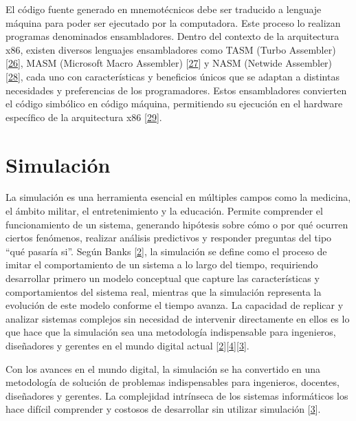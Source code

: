 \documentclass[12pt,twoside]{templates/unerthesis}
\begin{document}
El código fuente generado en mnemotécnicos debe ser traducido a lenguaje máquina para poder ser ejecutado por la computadora. Este proceso lo realizan programas denominados ensambladores. Dentro del contexto de la arquitectura x86, existen diversos lenguajes ensambladores como TASM (Turbo Assembler) {[}\protect\hyperlink{ref-tasm}{26}{]}, MASM (Microsoft Macro Assembler) {[}\protect\hyperlink{ref-masm}{27}{]} y NASM (Netwide Assembler) {[}\protect\hyperlink{ref-nasm}{28}{]}, cada uno con características y beneficios únicos que se adaptan a distintas necesidades y preferencias de los programadores. Estos ensambladores convierten el código simbólico en código máquina, permitiendo su ejecución en el hardware específico de la arquitectura x86 {[}\protect\hyperlink{ref-hyde2010art}{29}{]}.

\hypertarget{simulaciuxf3n}{%
\section{Simulación}\label{simulaciuxf3n}}

La simulación es una herramienta esencial en múltiples campos como la medicina, el ámbito militar, el entretenimiento y la educación. Permite comprender el funcionamiento de un sistema, generando hipótesis sobre cómo o por qué ocurren ciertos fenómenos, realizar análisis predictivos y responder preguntas del tipo ``qué pasaría si''. Según Banks {[}\protect\hyperlink{ref-banks_discrete-event_2010}{2}{]}, la simulación se define como el proceso de imitar el comportamiento de un sistema a lo largo del tiempo, requiriendo desarrollar primero un modelo conceptual que capture las características y comportamientos del sistema real, mientras que la simulación representa la evolución de este modelo conforme el tiempo avanza. La capacidad de replicar y analizar sistemas complejos sin necesidad de intervenir directamente en ellos es lo que hace que la simulación sea una metodología indispensable para ingenieros, diseñadores y gerentes en el mundo digital actual {[}\protect\hyperlink{ref-banks_discrete-event_2010}{2}{]}{[}\protect\hyperlink{ref-robinson_simulation_2014}{4}{]}{[}\protect\hyperlink{ref-law_simulation_2015}{3}{]}.

Con los avances en el mundo digital, la simulación se ha convertido en una metodología de solución de problemas indispensables para ingenieros, docentes, diseñadores y gerentes. La complejidad intrínseca de los sistemas informáticos los hace difícil comprender y costosos de desarrollar sin utilizar simulación {[}\protect\hyperlink{ref-law_simulation_2015}{3}{]}.
\end{document}
